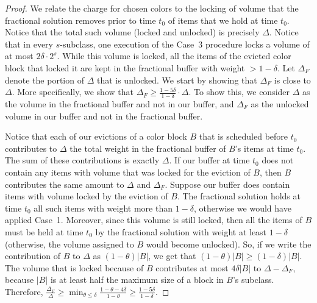 \documentclass[12pt]{article}
\begin{document}
\begin{proof}
We relate the charge for chosen colors to the locking of volume that 
the fractional solution removes prior to time $t_0$ of items that we 
hold at time $t_0$. Notice that the total such volume (locked and
unlocked) is precisely $\Delta$. Notice that in every $s$-subclass, 
one execution of the Case~3 procedure locks a volume of at most
$2\delta\cdot 2^s$. While this volume is locked, all the items of
the evicted color block that locked it are kept in the fractional
buffer with weight $> 1 - \delta$. Let $\Delta_F$ denote the 
portion of $\Delta$ that is unlocked. 
We start by showing that $\Delta_F$ is close to $\Delta$. More 
specifically, we show that 
$\Delta_F \geq\frac{1-5\delta}{1-\delta}\cdot\Delta$.
To show this, we consider $\Delta$ as the volume in the fractional
buffer and not in our buffer, and $\Delta_F$ as the unlocked volume 
in our buffer and not in the fractional buffer.

Notice that each of our evictions of a color block
$B$ that is scheduled before $t_0$ contributes to $\Delta$ the total 
weight in the fractional buffer of $B$'s items at time $t_0$. The
sum of these contributions is exactly $\Delta$. If our buffer at time
$t_0$ does not contain any items with volume that was locked for 
the eviction of $B$, then $B$ contributes the same amount to $\Delta$
and $\Delta_F$. Suppose our buffer does contain items
with volume locked by the eviction of $B$. The fractional solution holds 
at time $t_0$ all such items with weight more than $1 - \delta$, 
otherwise we would have applied Case~1. Moreover, since this volume
is still locked, then all the items of $B$ must be held at time $t_0$ by 
the fractional solution with weight at least $1 - \delta$ (otherwise, the
volume assigned to $B$ would become unlocked).
So, if we 
write the contribution of $B$ to $\Delta$ as $(1 - \theta) |B|$, we get 
that $(1 - \theta) |B|\ge (1-\delta) |B|$. The volume that is locked
because of $B$ contributes at most $4\delta |B|$ to 
$\Delta-\Delta_F$, because $|B|$ is at least half the maximum size of
a block in $B$'s subclass. Therefore,
$\frac{\Delta_F}{\Delta}\ge
\min_{\theta\le\delta} \frac {1-\theta-4\delta}{1-\theta}
\geq\frac {1-5\delta}{1-\delta}$.


\end{proof}
\end{document}

